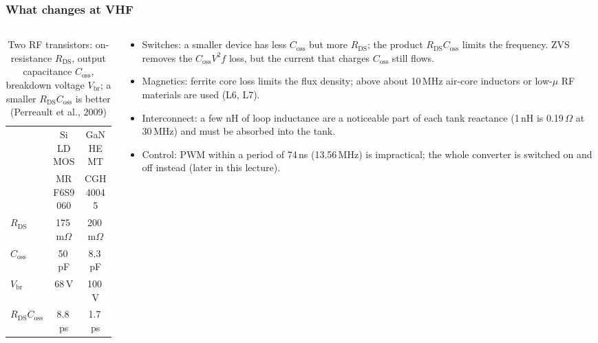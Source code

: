 \begin{frame}
	\frametitle{What changes at VHF}
	\begin{columns}[T]
		\begin{column}{0.44\textwidth}
			\begin{table}
				\centering
				\footnotesize
				\begin{tabular}{|l|c|c|}
					\hline
					                                         & Si LDMOS     & GaN HEMT     \\
					                                         & MRF6S9060    & CGH40045     \\
					\hline
					$R_\mathrm{DS}$                          & 175\,m$\Omega$ & 200\,m$\Omega$ \\
					$C_\mathrm{oss}$                         & 50\,pF       & 8.3\,pF      \\
					$V_\mathrm{br}$                          & 68\,V        & 100\,V       \\
					$R_\mathrm{DS}C_\mathrm{oss}$            & 8.8\,ps      & 1.7\,ps      \\
					\hline
				\end{tabular}
				\caption{Two RF transistors: on-resistance $R_\mathrm{DS}$, output capacitance $C_\mathrm{oss}$, breakdown voltage $V_\mathrm{br}$; a smaller $R_\mathrm{DS}C_\mathrm{oss}$ is better (Perreault et al., 2009)}
			\end{table}
		\end{column}
		\begin{column}{0.53\textwidth}
			\footnotesize
			\begin{itemize}
				\item Switches: a smaller device has less $C_\mathrm{oss}$ but more $R_\mathrm{DS}$; the product $R_\mathrm{DS}C_\mathrm{oss}$ limits the frequency. ZVS removes the $C_\mathrm{oss}V^2f$ loss, but the current that charges $C_\mathrm{oss}$ still flows.
				\item Magnetics: ferrite core loss limits the flux density; above about 10\,MHz air-core inductors or low-$\mu$ RF materials are used (L6, L7).
				\item Interconnect: a few nH of loop inductance are a noticeable part of each tank reactance (1\,nH is 0.19\,$\Omega$ at 30\,MHz) and must be absorbed into the tank.
				\item Control: PWM within a period of 74\,ns (13.56\,MHz) is impractical; the whole converter is switched on and off instead (later in this lecture).
			\end{itemize}
		\end{column}
	\end{columns}
\end{frame}

